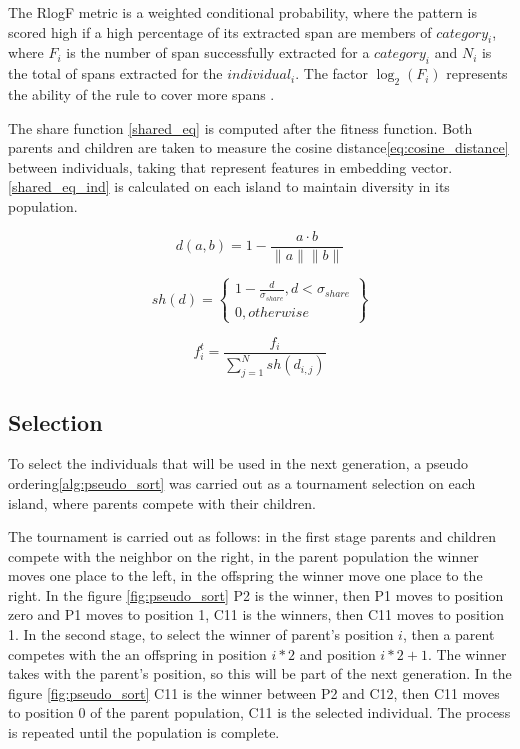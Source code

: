 The RlogF metric is a weighted conditional probability, where the pattern is scored high if a high percentage of its extracted span are members of ${category_i}$\cite{seman_lex}, where ${F_i}$ is the number of span successfully extracted for a ${category_i}$ and ${ N_i}$ is the total of spans extracted for the ${individual_i}$. The factor ${\log_2}({F_i})$ represents the ability of the rule to cover more spans \cite{tallor}.

The share function \ref{shared_eq} is computed after the fitness function. Both parents and children are taken to measure the cosine distance\ref{eq:cosine_distance} between individuals, taking that represent features in embedding vector. \ref{shared_eq_ind} is calculated on each island to maintain diversity in its population.

\begin{equation}
  \label{eq:cosine_distance}
  d(a, b) = 1- \frac{a \cdot b}{\|a\| \|b\|}
\end{equation}


\begin{equation}
  \label{shared_eq}
  sh(d) = \left \{
  \begin{array}{l}
    1  - \frac{d}{\sigma_{share}}, d < {\sigma_{share}} \\
    0, otherwise
  \end{array}
  \right \}
\end{equation}


\begin{equation}
  \label{shared_eq_ind}
  f^t_i = \frac{f_i}{\sum_{j=1}^N sh(d_{i,j})}
\end{equation}

\subsection{Selection}

To select the individuals that will be used in the next generation, a pseudo ordering\ref{alg:pseudo_sort} was carried out as a tournament selection on each island, where parents compete with their children.

The tournament is carried out as follows: in the first stage parents and children compete with the neighbor on the right, in the parent population the winner moves one place to the left, in the offspring the winner move one place to the right. In the figure \ref{fig:pseudo_sort} P2 is the winner, then P1 moves to position zero and P1 moves to position 1, C11 is the winners, then C11 moves to position 1. In the second stage, to select the winner of parent's position $i$, then a parent competes  with the an offspring in position $i * 2$ and position $i * 2 + 1$. The winner takes with the parent's position, so this will be part of the next generation. In the figure \ref{fig:pseudo_sort} C11 is the winner between P2 and C12, then C11 moves to position 0 of the parent population, C11 is the selected individual. The process is repeated until the population is complete.



